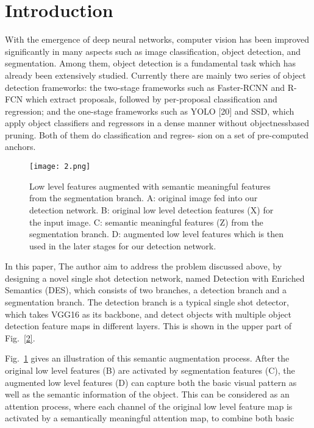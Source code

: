 \documentclass[10pt,twocolumn,letterpaper]{article}
\begin{document}
\section{Introduction}
With the emergence of deep neural networks, computer vision  has  been  improved  significantly  in  many  aspects such as image classification\cite{He2016Deep}, object detection\cite{HeK2016Deep}, and segmentation. Among them, object detection is a fundamental task which has already been extensively studied. Currently there are mainly two series of object detection frameworks: the two-stage frameworks  such as Faster-RCNN and R-FCN which extract proposals, followed by per-proposal
classification and regression; and the one-stage frameworks such as YOLO [20] and SSD, which apply object classifiers and regressors in a dense manner without objectnessbased pruning.  Both of them do classification and regres- sion on a set of pre-computed anchors.
\par
\begin{figure}
	\begin{center}
		\texttt{[image: 2.png]}\\
		\caption{Low level features augmented with semantic meaningful
			features from the segmentation branch. A: original image fed into
			our detection network. B: original low level detection features (X)
			for the input image. C: semantic meaningful features (Z) from
			the segmentation branch. D: augmented low level features which is then used in the later stages for our detection
			network.
			}\label{1}
	\end{center}
\end{figure}
In this paper, The author aim to address the problem discussed above, by designing a novel single shot detection network, named Detection with Enriched Semantics (DES), which consists of two branches, a detection branch and a segmentation branch. The detection branch is a typical single shot detector,  which takes VGG16 as its backbone, and detect objects with multiple object detection feature maps in different layers. This is shown in the upper part of Fig.~\ref{2}.
\par
Fig.~\ref{1} gives an illustration of this semantic augmentation process. After the original low level features (B) are activated by segmentation features (C), the augmented low level features (D) can capture both the basic visual pattern as well as the semantic information of the object. This can be considered as an attention process, where each channel of the original low level feature map is activated by a semantically meaningful attention map, to combine both basic
\end{document}
